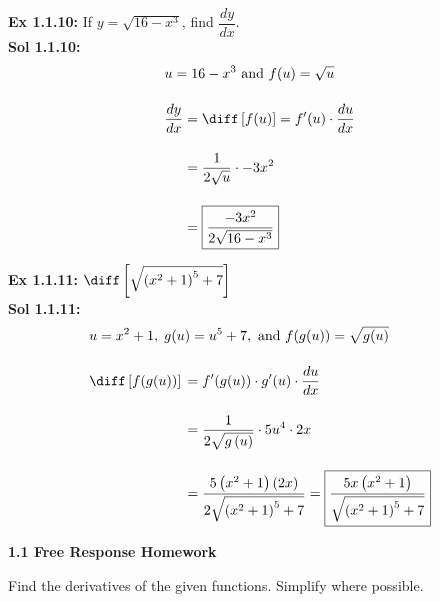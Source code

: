 \textbf{Ex 1.1.10:} If $y = \sqrt{16 - x^3}$, find $\dfrac{dy}{dx}$. \\[11pt]
\textbf{Sol 1.1.10:} \begin{align*}
    & u = 16 - x^3 \text{ and } f(u) = \sqrt{u} \\[11pt]
    & \dfrac{dy}{dx} \begin{aligned}[t]
        & = \diff \left[f(u)\right] = f'(u) \cdot \dfrac{du}{dx} \\[11pt] 
        & = \dfrac{1}{2\sqrt{u}} \cdot -3x^2 \\[11pt]
        & = \boxed{\dfrac{-3x^2}{2\sqrt{16 - x^3}}}
    \end{aligned}
\end{align*} 

\textbf{Ex 1.1.11:} $\diff \left[\sqrt{\left(x^2 + 1\right)^5 + 7}\right]$ \\[11pt]
\textbf{Sol 1.1.11:}\begin{align*}
    & u = x^2 + 1, \; g(u) = u^5 + 7, \text{ and } f(g(u)) = \sqrt{g(u)} \\[11pt]
    & \diff \left[f(g(u))\right] \begin{aligned}[t]
        & = f'(g(u)) \cdot g'(u) \cdot \dfrac{du}{dx} \\[11pt]
        & = \dfrac{1}{2\sqrt{g\left(u\right)}} \cdot 5u^4 \cdot 2x \\[11pt]
        & = \dfrac{5\left(x^2 + 1\right)(2x)}{2\sqrt{\left(x^2 + 1\right)^5 + 7}} = \boxed{\dfrac{5x\left(x^2 + 1\right)}{\sqrt{\left(x^2 + 1\right)^5 + 7}}}
    \end{aligned}
\end{align*}

\newpage

\textbf{\large{1.1 Free Response Homework}} \par

Find the derivatives of the given functions. Simplify where possible. \par

 \\[11pt]
 \\[11pt]
 \\[11pt]
 \\[11pt]
 \\[11pt]

